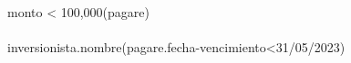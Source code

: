 \\\sigma monto < 100,000(pagare)\\\\
\prod inversionista.nombre(\sigma pagare.fecha-vencimiento<31/05/2023)\\\\
\prod 
